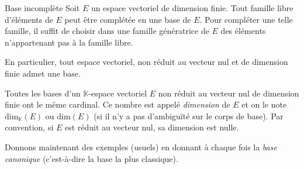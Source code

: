 \documentclass[french,11pt,twoside]{VcCours}
\begin{document}
 
 \begin{Theoreme}{Base incomplète}\label{BaseInc}
 Soit $E$ un espace vectoriel de dimension finie. Tout famille libre d'éléments de $E$ peut être complétée en une base de $E$. Pour compléter une telle famille, il suffit de choisir dans une famille génératrice de $E$ des éléments n'appartenant pas à la famille libre.
 
 \medskip
 
En particulier, tout espace vectoriel, non réduit au vecteur nul et de dimension finie admet une base.
 \end{Theoreme}
% 
% 
 \begin{Theoreme}{} Toutes les bases d'un $\mathbb{K}$-espace vectoriel $E$ non réduit au vecteur nul de dimension finie ont le même cardinal. Ce nombre est appelé \emph{dimension} de $E$ et on le note $\textrm{dim}_{\mathbb{K}}(E)$ ou $\textrm{dim}(E)$ (si il n'y a pas d'ambiguïté sur le corps de base). Par convention, si $E$ est réduit au vecteur nul, sa dimension est nulle.
 \end{Theoreme}
 
\newpage
 
 Donnons maintenant des exemples (usuels) en donnant à chaque fois la \emph{base canonique} (c'est-à-dire la base la plus classique).
 
 \medskip
 
 
\end{document}
